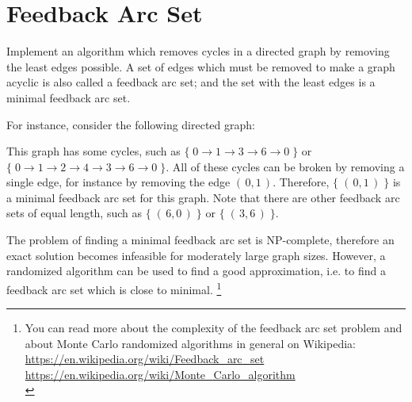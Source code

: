

\usepackage{multicol}
\usepackage{tikz}
\usetikzlibrary{arrows}




\section*{Feedback Arc Set}
\label{sec:intro}

Implement an algorithm which removes cycles in a directed graph
by removing the least edges possible.
A set of edges which must be removed to make a graph acyclic
is also called a feedback arc set;
and the set with the least edges is a minimal feedback arc set.

For instance, consider the following directed graph:

\begin{center}
\end{center}

This graph has some cycles, such as
$\{\;0\rightarrow 1\rightarrow 3\rightarrow 6\rightarrow 0\;\}$
or
$\{\;0\rightarrow 1\rightarrow 2\rightarrow 4\rightarrow 3\rightarrow 6\rightarrow 0\;\}$.
All of these cycles can be broken by removing a single edge,
for instance by removing the edge $(\,0,1\,)$.
Therefore, $\{\;(\,0,1\,)\;\}$ is a minimal feedback arc set for this graph.
Note that there are other feedback arc sets of equal length,
such as $\{\;(\,6,0\,)\;\}$ or $\{\;(\,3,6\,)\;\}$.

The problem of finding a minimal feedback arc set is NP-complete,
therefore an exact solution becomes infeasible for moderately large graph sizes.
However, a randomized algorithm can be used to find a good approximation,
i.e. to find a feedback arc set which is close to minimal.
\footnote{
You can read more about the complexity of the feedback arc set problem
and about Monte Carlo randomized algorithms in general on Wikipedia:\\
\url{https://en.wikipedia.org/wiki/Feedback_arc_set}\\
\url{https://en.wikipedia.org/wiki/Monte_Carlo_algorithm}\\
}

